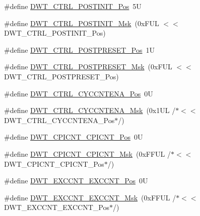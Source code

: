 \begin{DoxyCompactItemize}
\item 
\#define \mbox{\hyperlink{group___c_m_s_i_s___d_w_t_ga2868c0b28eb13be930afb819f55f6f25}{D\+W\+T\+\_\+\+C\+T\+R\+L\+\_\+\+P\+O\+S\+T\+I\+N\+I\+T\+\_\+\+Pos}}~5U
\item 
\#define \mbox{\hyperlink{group___c_m_s_i_s___d_w_t_gab8cbbee1e1d94d09f9a1f86379a08ee8}{D\+W\+T\+\_\+\+C\+T\+R\+L\+\_\+\+P\+O\+S\+T\+I\+N\+I\+T\+\_\+\+Msk}}~(0x\+F\+U\+L $<$$<$ D\+W\+T\+\_\+\+C\+T\+R\+L\+\_\+\+P\+O\+S\+T\+I\+N\+I\+T\+\_\+\+Pos)
\item 
\#define \mbox{\hyperlink{group___c_m_s_i_s___d_w_t_ga129bc152febfddd67a0c20c6814cba69}{D\+W\+T\+\_\+\+C\+T\+R\+L\+\_\+\+P\+O\+S\+T\+P\+R\+E\+S\+E\+T\+\_\+\+Pos}}~1U
\item 
\#define \mbox{\hyperlink{group___c_m_s_i_s___d_w_t_ga11d9e1e2a758fdd2657aa68ce61b9c9d}{D\+W\+T\+\_\+\+C\+T\+R\+L\+\_\+\+P\+O\+S\+T\+P\+R\+E\+S\+E\+T\+\_\+\+Msk}}~(0x\+F\+U\+L $<$$<$ D\+W\+T\+\_\+\+C\+T\+R\+L\+\_\+\+P\+O\+S\+T\+P\+R\+E\+S\+E\+T\+\_\+\+Pos)
\item 
\#define \mbox{\hyperlink{group___c_m_s_i_s___d_w_t_gaa4509f5f8514a7200be61691f0e01f10}{D\+W\+T\+\_\+\+C\+T\+R\+L\+\_\+\+C\+Y\+C\+C\+N\+T\+E\+N\+A\+\_\+\+Pos}}~0U
\item 
\#define \mbox{\hyperlink{group___c_m_s_i_s___d_w_t_ga4a9d209dc2a81ea6bfa0ea21331769d3}{D\+W\+T\+\_\+\+C\+T\+R\+L\+\_\+\+C\+Y\+C\+C\+N\+T\+E\+N\+A\+\_\+\+Msk}}~(0x1\+U\+L /$\ast$$<$$<$ D\+W\+T\+\_\+\+C\+T\+R\+L\+\_\+\+C\+Y\+C\+C\+N\+T\+E\+N\+A\+\_\+\+Pos$\ast$/)
\item 
\#define \mbox{\hyperlink{group___c_m_s_i_s___d_w_t_ga80e9ad8f6a9e2344af8a3cf989bebe3d}{D\+W\+T\+\_\+\+C\+P\+I\+C\+N\+T\+\_\+\+C\+P\+I\+C\+N\+T\+\_\+\+Pos}}~0U
\item 
\#define \mbox{\hyperlink{group___c_m_s_i_s___d_w_t_ga76f39e7bca3fa86a4dbf7b8f6adb7217}{D\+W\+T\+\_\+\+C\+P\+I\+C\+N\+T\+\_\+\+C\+P\+I\+C\+N\+T\+\_\+\+Msk}}~(0x\+F\+F\+U\+L /$\ast$$<$$<$ D\+W\+T\+\_\+\+C\+P\+I\+C\+N\+T\+\_\+\+C\+P\+I\+C\+N\+T\+\_\+\+Pos$\ast$/)
\item 
\#define \mbox{\hyperlink{group___c_m_s_i_s___d_w_t_ga031c693654030d4cba398b45d2925b1d}{D\+W\+T\+\_\+\+E\+X\+C\+C\+N\+T\+\_\+\+E\+X\+C\+C\+N\+T\+\_\+\+Pos}}~0U
\item 
\#define \mbox{\hyperlink{group___c_m_s_i_s___d_w_t_ga057fa604a107b58a198bbbadb47e69c9}{D\+W\+T\+\_\+\+E\+X\+C\+C\+N\+T\+\_\+\+E\+X\+C\+C\+N\+T\+\_\+\+Msk}}~(0x\+F\+F\+U\+L /$\ast$$<$$<$ D\+W\+T\+\_\+\+E\+X\+C\+C\+N\+T\+\_\+\+E\+X\+C\+C\+N\+T\+\_\+\+Pos$\ast$/)
\item 

\end{DoxyCompactItemize}
